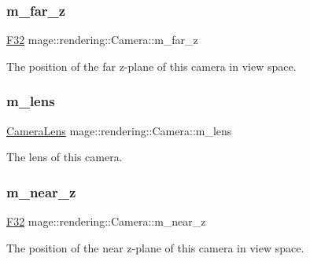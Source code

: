 \subsubsection{\texorpdfstring{m\+\_\+far\+\_\+z}{m\_far\_z}}
{\footnotesize\ttfamily \hyperlink{namespacemage_aa97e833b45f06d60a0a9c4fc22ae02c0}{F32} mage\+::rendering\+::\+Camera\+::m\+\_\+far\+\_\+z\hspace{0.3cm}{\ttfamily [private]}}

The position of the far z-\/plane of this camera in view space. \hypertarget{classmage_1_1rendering_1_1_camera_a0716fc9d2b3c8f41da75205caa428189}{}\label{classmage_1_1rendering_1_1_camera_a0716fc9d2b3c8f41da75205caa428189} 
\subsubsection{\texorpdfstring{m\+\_\+lens}{m\_lens}}
{\footnotesize\ttfamily \hyperlink{classmage_1_1rendering_1_1_camera_lens}{Camera\+Lens} mage\+::rendering\+::\+Camera\+::m\+\_\+lens\hspace{0.3cm}{\ttfamily [private]}}

The lens of this camera. \hypertarget{classmage_1_1rendering_1_1_camera_ada7de69941daee12a7f798d8f056ffc6}{}\label{classmage_1_1rendering_1_1_camera_ada7de69941daee12a7f798d8f056ffc6} 
\subsubsection{\texorpdfstring{m\+\_\+near\+\_\+z}{m\_near\_z}}
{\footnotesize\ttfamily \hyperlink{namespacemage_aa97e833b45f06d60a0a9c4fc22ae02c0}{F32} mage\+::rendering\+::\+Camera\+::m\+\_\+near\+\_\+z\hspace{0.3cm}{\ttfamily [private]}}

The position of the near z-\/plane of this camera in view space. \hypertarget{classmage_1_1rendering_1_1_camera_a9a8cfd88c1a3b2b54779bbe0f34d30d2}{}\label{classmage_1_1rendering_1_1_camera_a9a8cfd88c1a3b2b54779bbe0f34d30d2} 
